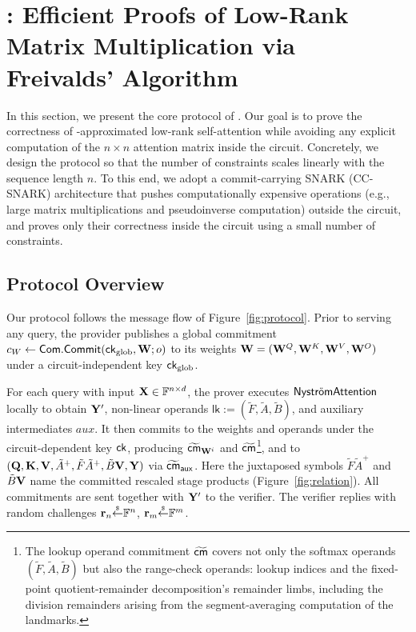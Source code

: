 \documentclass[runningheads]{llncs}
\begin{document}
\section{\name: Efficient Proofs of Low-Rank Matrix Multiplication via Freivalds' Algorithm}
\label{sec:protocol}

In this section, we present the core protocol of \name. Our goal is to prove the correctness of \nystrom-approximated low-rank self-attention while avoiding any explicit computation of the $n \times n$ attention matrix inside the circuit. Concretely, we design the protocol so that the number of constraints scales linearly with the sequence length $n$. To this end, we adopt a commit-carrying SNARK (CC-SNARK) architecture that pushes computationally expensive operations (e.g., large matrix multiplications and pseudoinverse computation) outside the circuit, and proves only their correctness inside the circuit using a small number of constraints.


\subsection{Protocol Overview}
Our protocol follows the message flow of Figure~\ref{fig:protocol}. Prior to serving any query, the provider publishes a global commitment $c_W \gets {\sf Com}.{\sf Commit}({\sf ck}_{\mathrm{glob}}, {\mathbf{W}}; o)$ to its weights ${\mathbf{W}}=({\mathbf{W}}^Q,{\mathbf{W}}^K,{\mathbf{W}}^V,{\mathbf{W}}^O)$ under a circuit-independent key ${\sf ck}_{\mathrm{glob}}$.

For each query with input ${\mathbf{X}}\in\mathbb{F}^{n\times d}$, the prover executes $\textsf{Nystr\"omAttention}$ locally to obtain ${\mathbf{Y}}'$, non-linear operands $\mathsf{lk}:=(\tilde{F},\tilde{A},\tilde{B})$, and auxiliary intermediates $\textit{aux}$. It then commits to the weights and operands under the circuit-dependent key ${\sf ck}$, producing $\widetilde{{\sf cm}}_{{\mathbf{W}}^i}$ and $\widetilde{{\sf cm}}$\footnote{\label{fn:lkp-scope}The lookup operand commitment $\widetilde{{\sf cm}}$ covers not only the softmax operands $(\tilde{F},\tilde{A},\tilde{B})$ but also the range-check operands: lookup indices and the fixed-point quotient-remainder decomposition's remainder limbs, including the division remainders arising from the segment-averaging computation of the landmarks.}, and to $({\mathbf{Q}},{\mathbf{K}},{\mathbf{V}},\tilde{A}^{+},\tilde{F}\tilde{A}^{+},\tilde{B}{\mathbf{V}},{\mathbf{Y}})$ via $\widetilde{{\sf cm}}_{\mathsf{aux}}$. Here the juxtaposed symbols $\tilde{F}\tilde{A}^{+}$ and $\tilde{B}{\mathbf{V}}$ name the committed rescaled stage products (Figure~\ref{fig:relation}). All commitments are sent together with ${\mathbf{Y}}'$ to the verifier. The verifier replies with random challenges ${\mathbf{r}}_n{\overset{{\scriptscriptstyle\$}}{\leftarrow}}\mathbb{F}^n$, ${\mathbf{r}}_m{\overset{{\scriptscriptstyle\$}}{\leftarrow}}\mathbb{F}^m$.
\end{document}
